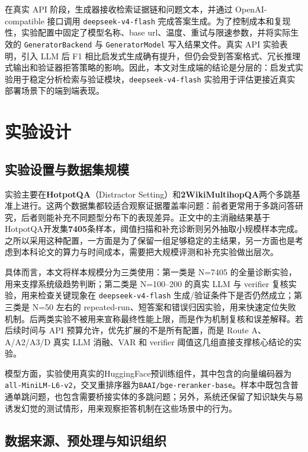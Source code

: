 在真实 API 阶段，生成器接收检索证据链和问题文本，并通过 OpenAI-compatible 接口调用 \texttt{deepseek-v4-flash} 完成答案生成。为了控制成本和复现性，实验配置中固定了模型名称、base url、温度、重试与限速参数，并将实际生效的 \texttt{GeneratorBackend} 与 \texttt{GeneratorModel} 写入结果文件。真实 API 实验表明，引入 LLM 后 F1 相比启发式生成确有提升，但仍会受到答案格式、冗长推理式输出和验证器拒答策略的影响。因此，本文对生成端的结论是分层的：启发式实验用于稳定分析检索与验证模块，\texttt{deepseek-v4-flash} 实验用于评估更接近真实部署场景下的端到端表现。

\section{实验设计}

\subsection{实验设置与数据集规模}

实验主要在\textbf{HotpotQA}（Distractor Setting）和\textbf{2WikiMultihopQA}两个多跳基准上进行。这两个数据集都较适合观察证据覆盖率问题：前者更常用于多跳问答研究，后者则能补充不同题型分布下的表现差异。正文中的主消融结果基于HotpotQA开发集\textbf{7405}条样本，阈值扫描和补充诊断则另外抽取小规模样本完成。之所以采用这种配置，一方面是为了保留一组足够稳定的主结果，另一方面也是考虑到本科论文的算力与时间成本，需要把大规模评测和补充实验做出层次。

具体而言，本文将样本规模分为三类使用：第一类是 N=7405 的全量诊断实验，用来支撑系统级趋势判断；第二类是 N=100--200 的真实 LLM 与 verifier 复核实验，用来检查关键现象在 \texttt{deepseek-v4-flash} 生成/验证条件下是否仍然成立；第三类是 N=50 左右的 repeated-run、短答案和错误归因实验，用来快速定位失败机制。后两类实验不被用来宣称最终性能上限，而是作为机制复核和误差解释。若后续时间与 API 预算允许，优先扩展的不是所有配置，而是 Route A、A/A2/A3/D 真实 LLM 消融、VAR 和 verifier 阈值这几组直接支撑核心结论的实验。

模型方面，实验使用真实的HuggingFace预训练组件，其中包含的向量编码器为\texttt{all-MiniLM-L6-v2}，交叉重排序器为\texttt{BAAI/bge-reranker-base}。样本中既包含普通单跳问题，也包含需要桥接实体的多跳问题；另外，系统还保留了知识缺失与易诱发幻觉的测试情形，用来观察拒答机制在这些场景中的行为。

\subsection{数据来源、预处理与知识组织}


